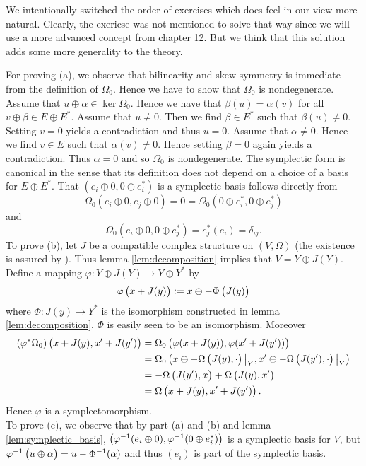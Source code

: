 \begin{remark}
	We intentionally switched the order of exercises which does feel in our view more natural. Clearly, the exericse was not mentioned to solve that way since we will use a more advanced concept from chapter 12. But we think that this solution adds some more generality to the theory.
\end{remark}

\begin{solution}
	For proving (a), we observe that bilinearity and skew-symmetry is immediate from the definition of $\Omega_0$. Hence we have to show that $\Omega_0$ is nondegenerate. Assume that $u \oplus \alpha \in \ker \Omega_0$. Hence we have that $\beta(u) = \alpha(v)$ for all $v \oplus \beta \in E \oplus E^*$. Assume that $u \neq 0$. Then we find $\beta \in E^*$ such that $\beta(u) \neq 0$. Setting $v = 0$ yields a contradiction and thus $u = 0$. Assume that $\alpha \neq 0$. Hence we find $v \in E$ such that $\alpha(v) \neq 0$. Hence setting $\beta = 0$ again yields a contradiction. Thus $\alpha = 0$ and so $\Omega_0$ is nondegenerate. The symplectic form is canonical in the sense that its definition does not depend on a choice of a basis for $E \oplus E^*$. That $(e_i \oplus 0, 0 \oplus e_i^*)$ is a symplectic basis follows directly from 
	\begin{equation*}
		\Omega_0(e_i \oplus 0, e_j \oplus 0) = 0 = \Omega_0(0 \oplus e_i^*, 0 \oplus e_j^*)
	\end{equation*}
	\noindent and
	\begin{equation*}
		\Omega_0(e_i \oplus 0, 0 \oplus e_j^*) = e_j^*(e_i) = \delta_{ij}.
	\end{equation*}
	To prove (b), let $J$ be a compatible complex structure on $(V,\Omega)$ (the existence is assured by \cite[84]{dasilva:symplectic:2008}). Thus lemma \ref{lem:decomposition} implies that $V = Y \oplus J(Y)$. Define a mapping $\varphi: Y \oplus J(Y) \to Y \oplus Y^*$ by 
\begin{equation*}
\varphi\del[1]{x + J(y)} := x \oplus -\Phi\del[1]{J(y)}
\end{equation*}
\noindent where $\Phi : J(y) \to Y^*$ is the isomorphism constructed in lemma \ref{lem:decomposition}. $\Phi$ is easily seen to be an isomorphism. Moreover
\begin{align*}
(\varphi^*\Omega_0)\del[1]{x + J(y),x' + J(y')} &= \Omega_0\del[1]{\varphi(x + J(y)), \varphi(x' + J(y'))}\\
&= \Omega_0\del[1]{x \oplus -\Omega\del[1]{J(y),\cdot}\big\vert_Y, x' \oplus -\Omega\del[1]{J(y'),\cdot}\big\vert_Y}\\
&= -\Omega\del[1]{J(y'),x} + \Omega\del[1]{J(y),x'}\\
&= \Omega\del[1]{x + J(y),x' + J(y')}.
\end{align*}
Hence $\varphi$ is a symplectomorphism.\\
To prove (c), we observe that by part (a) and (b) and lemma \ref{lem:symplectic_basis}, $\del[1]{\varphi^{-1}(e_i \oplus 0), \varphi^{-1}(0 \oplus e_i^*)}$ is a symplectic basis for $V$, but $\varphi^{-1}\del[1]{u \oplus \alpha} = u - \Phi^{-1}(\alpha)$ and thus $(e_i)$ is part of the symplectic basis.
\end{solution}

